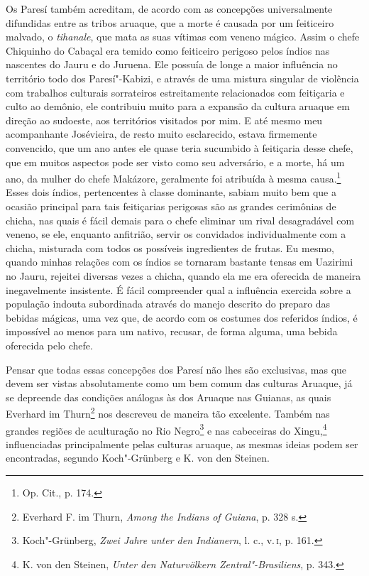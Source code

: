 Os Paresí também acreditam, de acordo com as concepções universalmente
difundidas entre as tribos aruaque, que a morte é causada por um
feiticeiro malvado, o \emph{tihanale}, que mata as suas vítimas com
veneno mágico. Assim o chefe Chiquinho do Cabaçal era temido como
feiticeiro perigoso pelos índios nas nascentes do Jauru e do Juruena.
Ele possuía de longe a maior influência no território todo dos
Paresí"-Kabizi, e através de uma mistura singular de violência com
trabalhos culturais sorrateiros estreitamente relacionados com
feitiçaria e culto ao demônio, ele contribuiu muito para a expansão da
cultura aruaque em direção ao sudoeste, aos territórios visitados por
mim. E até mesmo meu acompanhante Josévieira, de resto muito
esclarecido, estava firmemente convencido, que um ano antes ele quase
teria sucumbido à feitiçaria desse chefe, que em muitos aspectos pode
ser visto como seu adversário, e a morte, há um ano, da mulher do chefe
Makázore, geralmente foi atribuída à mesma causa.\footnote{Op. Cit., p.
  174.} Esses dois índios, pertencentes à classe dominante, sabiam
muito bem que a ocasião principal para tais feitiçarias perigosas são
as grandes cerimônias de chicha, nas quais é fácil demais para o chefe
eliminar um rival desagradável com veneno, se ele, enquanto anfitrião,
servir os convidados individualmente com a chicha, misturada com todos
os possíveis ingredientes de frutas. Eu mesmo, quando minhas relações
com os índios se tornaram bastante tensas em Uazirimi no Jauru,
rejeitei diversas vezes a chicha, quando ela me era oferecida de
maneira inegavelmente insistente. É fácil compreender qual a influência
exercida sobre a população indouta subordinada através do manejo
descrito do preparo das bebidas mágicas, uma vez que, de acordo com os
costumes dos referidos índios, é impossível ao menos para um nativo,
recusar, de forma alguma, uma bebida oferecida pelo chefe.

Pensar que todas essas concepções dos Paresí não lhes são exclusivas,
mas que devem ser vistas absolutamente como um bem comum das culturas
Aruaque, já se depreende das condições análogas às dos Aruaque nas
Guianas, as quais Everhard im Thurn\footnote{Everhard F. im Thurn,
  \emph{Among the Indians of Guiana}, p. 328 s.} nos descreveu de
maneira tão excelente. Também nas grandes regiões de aculturação no Rio
Negro\footnote{Koch"-Grünberg, \emph{Zwei Jahre unter den Indianern}, l.
  c., v.\,\textsc{i}, p. 161.} e nas cabeceiras do Xingu,\footnote{K. von den
  Steinen, \emph{Unter den Naturvölkern Zentral"-Brasiliens}, p. 343.}
influenciadas principalmente pelas culturas aruaque, as mesmas ideias
podem ser encontradas, segundo Koch"-Grünberg e K. von den Steinen.


